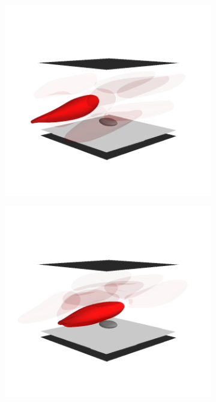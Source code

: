 \begin{figure}[th!]
    \begin{subfigure}[t]{0.5\textwidth}
        \includegraphics[trim=50 75 50 125, clip, width=\textwidth]{figures/flyover460.png}%
    \end{subfigure}%
    \begin{subfigure}[t]{0.5\textwidth}
        \includegraphics[trim=50 75 50 125, clip, width=\textwidth]{figures/flyover495.png}
    \end{subfigure}


\end{figure}
